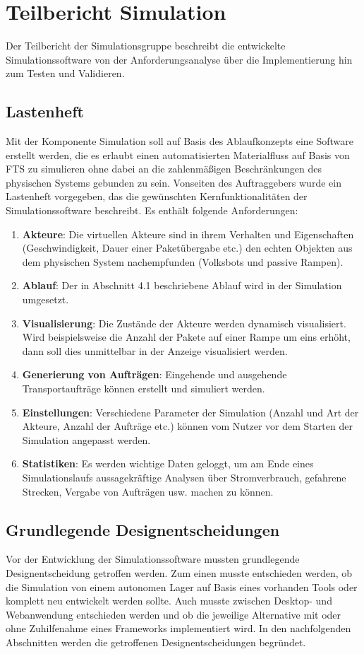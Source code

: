 \section{Teilbericht Simulation}
Der Teilbericht der Simulationsgruppe beschreibt die entwickelte Simulationssoftware von der Anforderungsanalyse über die Implementierung hin zum Testen und Validieren. 
\subsection{Lastenheft}
Mit der Komponente Simulation soll auf Basis des Ablaufkonzepts eine Software erstellt werden, die es erlaubt einen automatisierten Materialfluss auf Basis von FTS zu simulieren ohne dabei an die zahlenmäßigen Beschränkungen des physischen Systems gebunden zu sein. Vonseiten des Auftraggebers wurde ein Lastenheft vorgegeben, das die gewünschten Kernfunktionalitäten der Simulationssoftware beschreibt. Es enthält folgende Anforderungen:
\begin{enumerate}
\item \textbf{Akteure}: Die virtuellen Akteure sind in ihrem Verhalten und Eigenschaften (Geschwindigkeit, Dauer einer Paketübergabe etc.) den echten Objekten aus dem physischen System nachempfunden (Volksbots und passive Rampen).
\item \textbf{Ablauf}: Der in Abschnitt 4.1 beschriebene Ablauf wird in der Simulation umgesetzt. 
\item \textbf{Visualisierung}: Die Zustände der Akteure werden dynamisch visualisiert. Wird beispielsweise die Anzahl der Pakete auf einer Rampe um eins erhöht, dann soll dies unmittelbar in der Anzeige visualisiert werden.
\item \textbf{Generierung von Aufträgen}: Eingehende und ausgehende Transportaufträge können erstellt und simuliert werden. 
\item \textbf{Einstellungen}: Verschiedene Parameter der Simulation (Anzahl und Art der Akteure, Anzahl der Aufträge etc.) können vom Nutzer vor dem Starten der Simulation angepasst werden.
\item \textbf{Statistiken}: Es werden wichtige Daten geloggt, um am Ende eines Simulationslaufs aussagekräftige Analysen über Stromverbrauch, gefahrene Strecken, Vergabe von Aufträgen usw. machen zu können.
\end{enumerate}
\subsection{Grundlegende Designentscheidungen}
Vor der Entwicklung der Simulationssoftware mussten grundlegende Designentscheidung getroffen werden. Zum einen musste entschieden werden, ob die Simulation von einem autonomen Lager auf Basis eines vorhanden Tools oder komplett neu entwickelt werden sollte. Auch musste zwischen Desktop- und Webanwendung entschieden werden und ob die jeweilige Alternative mit oder ohne Zuhilfenahme eines Frameworks implementiert wird. In den nachfolgenden Abschnitten werden die getroffenen Designentscheidungen begründet.
